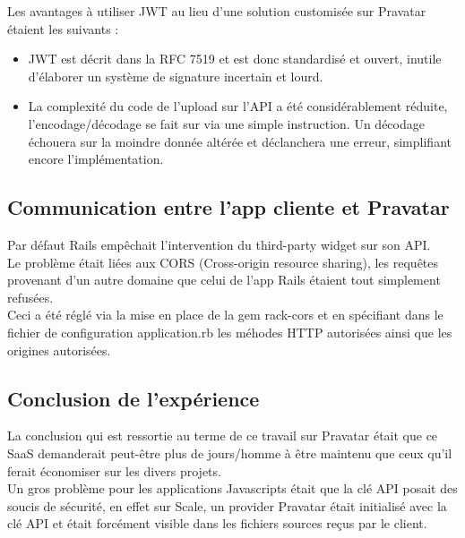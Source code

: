 \documentclass{report}
\begin{document}
          Les avantages à utiliser JWT au lieu d'une solution customisée sur Pravatar étaient les suivants :\\

          \begin{itemize}
            \item JWT est décrit dans la RFC 7519 et est donc standardisé et ouvert, inutile d'élaborer
          un système de signature incertain et lourd.
            \item La complexité du code de l'upload sur l'API a été considérablement réduite, l'encodage/décodage se fait sur via une simple instruction.
          Un décodage échouera sur la moindre donnée altérée et déclanchera une erreur, simplifiant encore l'implémentation.\\
          \end{itemize}

      \subsection{Communication entre l'app cliente et Pravatar}
      \label{sub:Communication entre l'app cliente et Pravatar}

        Par défaut Rails empêchait l'intervention du third-party widget sur son API.\\

        Le problème était liées aux CORS (Cross-origin resource sharing), les requêtes provenant d'un autre domaine
        que celui de l'app Rails étaient tout simplement refusées.\\

        Ceci a été réglé via la mise en place de la gem rack-cors et en spécifiant dans le fichier de configuration
        application.rb les méhodes HTTP autorisées ainsi que les origines autorisées.\\

      \subsection{Conclusion de l'expérience}
      \label{sub:Conclusion}

        La conclusion qui est ressortie au terme de ce travail sur Pravatar était que ce SaaS demanderait peut-être plus de jours/homme à être maintenu que ceux qu'il
        ferait économiser sur les divers projets.\\

        Un gros problème pour les applications Javascripts était que la clé API posait des soucis de sécurité, en effet sur Scale, un provider Pravatar était initialisé avec la clé
        API et était forcément visible dans les fichiers sources reçus par le client.\\
\end{document}
